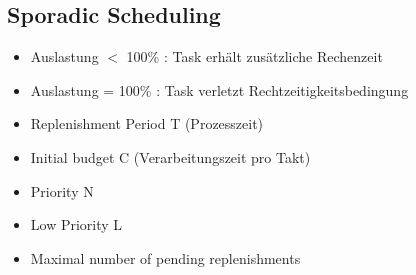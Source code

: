 \subsection{Sporadic Scheduling}
\begin{itemize}
	\item Auslastung $<$ 100\% : Task erhält zusätzliche Rechenzeit
	\item Auslastung = 100\% : Task verletzt Rechtzeitigkeitsbedingung
	\item Replenishment Period T (Prozesszeit)
	\item Initial budget C (Verarbeitungszeit pro Takt)
	\item Priority N
	\item Low Priority L
	\item Maximal number of pending replenishments
\end{itemize}